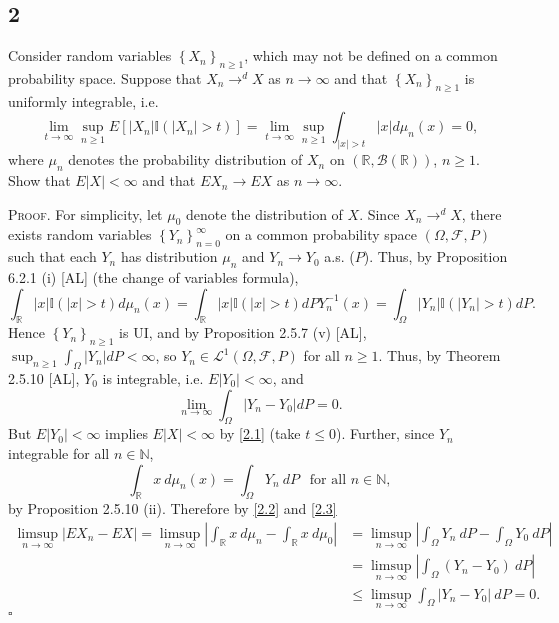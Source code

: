 \documentclass[12pt]{article}
\newcounter{ProofCounter}
\newenvironment{Proof}{\stepcounter{ProofCounter}\textsc{Proof.}}{\hfill$\square$}
\begin{document}
\subsection*{2}
\begin{tcolorbox}
Consider random variables $\left\{ X_{n} \right\}_{n\geq 1}$, which may not be defined on a common probability space. Suppose that $X_{n}
\rightarrow^{d} X$ as $n \rightarrow \infty$ and that $\left\{ X_{n} \right\}_{n\geq 1}$ is uniformly integrable, i.e.
\[ \lim_{t\rightarrow\infty}\sup_{n\geq 1}E\left[ |X_{n}|\mathbb{I}(|X_{n}| > t) \right] = \lim_{t\rightarrow\infty}\sup_{n\geq 1}\int_{|x| >
t}|x|d\mu_{n}(x) = 0, \]
where $\mu_{n}$ denotes the probability distribution of $X_n$ on $(\mathbb{R}, \mathcal{B}(\mathbb{R}))$, $n\geq 1$. Show that $E|X| < \infty$ and
that $EX_n \rightarrow EX$ as $n\rightarrow\infty$.
\end{tcolorbox}
\begin{Proof}
For simplicity, let $\mu_0$ denote the distribution of $X$. Since $X_n \rightarrow^{d} X$, there exists random variables $\left\{ Y_{n}
\right\}_{n=0}^{\infty}$ on a common probability space $(\Omega, \mathcal{F}, P)$ such that each $Y_n$ has distribution $\mu_n$ and $Y_n \rightarrow
Y_0$ a.s. ($P$). Thus, by Proposition 6.2.1 (i) [AL] (the change of variables formula),
\begin{equation}
\int_{\mathbb{R}}|x|\mathbb{I}(|x| > t)d\mu_n(x) = \int_{\mathbb{R}}|x|\mathbb{I}(|x| > t)dPY_{n}^{-1}(x) = \int_{\Omega}|Y_n|\mathbb{I}(|Y_n| > t)dP.
\label{2.1}
\end{equation}
Hence $\left\{ Y_n \right\}_{n\geq 1}$ is UI, and by Proposition 2.5.7 (v) [AL], $\sup_{n\geq 1}\int_{\Omega}|Y_n|dP < \infty$, so $Y_n \in
\mathcal{L}^{1}(\Omega, \mathcal{F}, P)$ for all $n \geq 1$. Thus, by Theorem 2.5.10 [AL], $Y_0$ is integrable, i.e. $E|Y_0| < \infty$, and 
\begin{equation}
\lim_{n\rightarrow\infty}\int_{\Omega}|Y_n - Y_0|dP = 0.
\label{2.2}
\end{equation}
But $E|Y_0| < \infty$ implies $E|X| < \infty$ by \eqref{2.1} (take $t \leq 0$). Further, since $Y_n$ integrable for all $n \in \mathbb{N}$,
\begin{equation}
\int_{\mathbb{R}}x\ d\mu_n(x) = \int_{\Omega}Y_n\ dP \ \ \text{ for all } n \in \mathbb{N}, 
\label{2.3}
\end{equation}
by Proposition 2.5.10 (ii). Therefore by \eqref{2.2} and \eqref{2.3}
\begin{align*}
\limsup_{n\rightarrow\infty}|EX_{n} - EX| = \limsup_{n\rightarrow\infty}\left| \int_{\mathbb{R}}x\ d\mu_n - \int_{\mathbb{R}} x\ d\mu_0 \right| & = 
\limsup_{n\rightarrow\infty}\left| \int_{\Omega}Y_n \ dP - \int_{\Omega}Y_0\ dP\right| \\
& = \limsup_{n\rightarrow\infty}\left| \int_{\Omega}(Y_n - Y_0)\ dP \right| \\
& \leq \limsup_{n\rightarrow\infty}\int_{\Omega}|Y_n - Y_0|\ dP = 0.
\end{align*}
\end{Proof}
\end{document}
